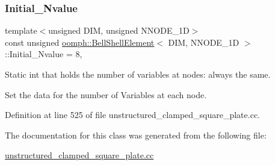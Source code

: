 \subsubsection{\texorpdfstring{Initial\+\_\+\+Nvalue}{Initial\_Nvalue}}
{\footnotesize\ttfamily template$<$unsigned D\+IM, unsigned N\+N\+O\+D\+E\+\_\+1D$>$ \\
const unsigned \hyperlink{classoomph_1_1BellShellElement}{oomph\+::\+Bell\+Shell\+Element}$<$ D\+IM, N\+N\+O\+D\+E\+\_\+1D $>$\+::Initial\+\_\+\+Nvalue = 8\hspace{0.3cm}{\ttfamily [static]}, {\ttfamily [private]}}



Static int that holds the number of variables at nodes\+: always the same. 

Set the data for the number of Variables at each node. 

Definition at line 525 of file unstructured\+\_\+clamped\+\_\+square\+\_\+plate.\+cc.



The documentation for this class was generated from the following file\+:\begin{DoxyCompactItemize}
\item 
\hyperlink{unstructured__clamped__square__plate_8cc}{unstructured\+\_\+clamped\+\_\+square\+\_\+plate.\+cc}\end{DoxyCompactItemize}

